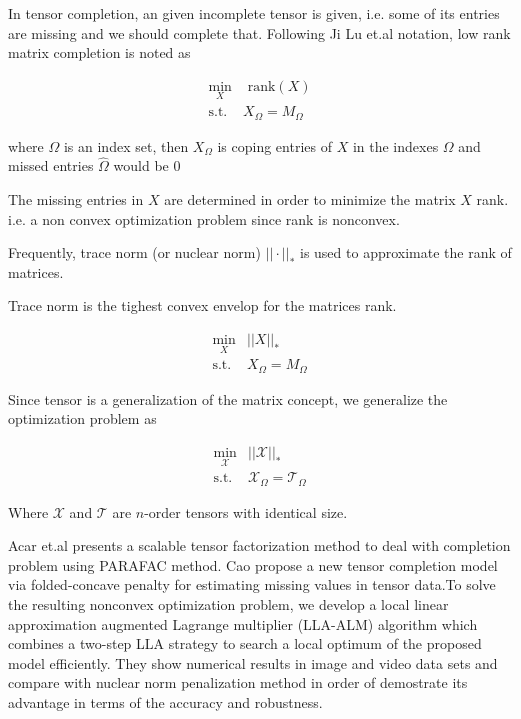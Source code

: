 \documentclass[letterpaper,12pt]{article}
\begin{document}
 In tensor completion, an given incomplete tensor is given, i.e. some of its entries are missing and we should complete that. Following Ji Lu et.al \cite{Liu2013} notation,  low rank matrix completion is noted as

\begin{equation} 
 \begin{split}
  \min_X & \text{ rank}(X)\\
  \text{s.t. } & X_\Omega = M_\Omega
 \end{split}
\end{equation}

where $\Omega$ is an index set, then $X_\Omega$ is coping entries of $X$ in the indexes $\Omega$ and missed entries $\hat{\Omega}$ would be $0$

The missing entries in $X$ are determined in order to minimize the matrix $X$ rank. i.e. a non convex optimization problem since rank is nonconvex.

Frequently, trace norm (or nuclear norm) $||\cdot ||_*$ is used to approximate the rank of matrices.

Trace norm is the tighest convex envelop for the matrices rank.

\begin{equation} 
 \begin{split}
  \min_X & ||X||_*\\
  \text{s.t. } & X_\Omega = M_\Omega
 \end{split}
\end{equation}

Since tensor is a generalization of the matrix concept, we generalize the  optimization problem as

\begin{equation} 
 \begin{split}
  \min_{\mathcal{X}} & ||\mathcal{X}||_*\\
  \text{s.t. } & \mathcal{X}_\Omega = \mathcal{T}_\Omega
 \end{split}
\end{equation}

Where $\mathcal{X}$ and $\mathcal{T}$ are $n$-order tensors with identical size.

Acar et.al \cite{Acar2011} presents a scalable tensor factorization method to deal with completion problem using PARAFAC method. Cao \cite{Cao2015} propose a new tensor completion model via folded-concave penalty for estimating missing values in tensor data.To solve the resulting nonconvex optimization problem, we develop a local linear approximation augmented Lagrange multiplier (LLA-ALM) algorithm which combines a two-step LLA strategy to search a local optimum of the proposed model efficiently. They show numerical results in image and video data sets and compare with nuclear norm penalization method in order of demostrate its advantage in terms of the accuracy and robustness.
\end{document}
